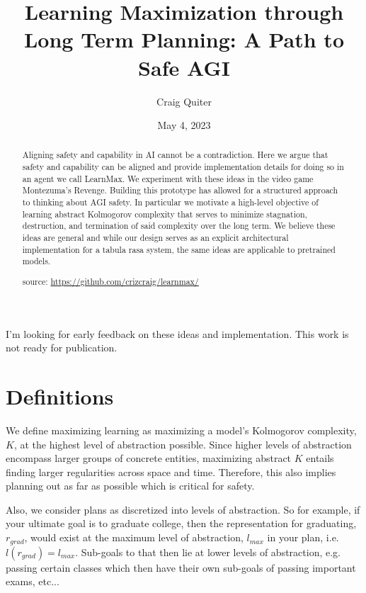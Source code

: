 \documentclass{article}
\title{Learning Maximization through Long Term Planning: A Path to Safe AGI}
\author{Craig Quiter}
\date{May 4, 2023}
\begin{document}
\maketitle

\begin{tcolorbox}
I'm looking for early feedback on these ideas and implementation. This work is not ready for publication.
\end{tcolorbox}

\begin{abstract}
Aligning safety and capability in AI cannot be a contradiction.
Here we argue that safety and capability can be aligned and provide implementation details for doing so in an agent we call LearnMax. We experiment with these ideas in the video game Montezuma's Revenge. Building this prototype has allowed for a structured approach to thinking about AGI safety. In particular we motivate a high-level objective of learning abstract Kolmogorov complexity that serves to minimize stagnation, destruction, and termination of said complexity over the long term. We believe these ideas are general and while our design serves as an explicit architectural implementation for a tabula rasa system, the same ideas are applicable to pretrained models.

source: \href{https://github.com/crizcraig/learnmax/}{https://github.com/crizcraig/learnmax/}
\end{abstract}

\setcounter{secnumdepth}{-1}

\section{Definitions}

We define maximizing learning as maximizing a model's Kolmogorov complexity, $K$,\cite{li2008introduction} at the highest level of abstraction possible. Since higher levels of abstraction encompass larger groups of concrete entities, maximizing abstract $K$ entails finding larger regularities across space and time. Therefore, this also implies planning out as far as possible which is critical for safety.

Also, we consider plans as discretized into levels of abstraction. So for example, if your ultimate goal is to graduate college, then the representation for graduating, $r_{grad}$, would exist at the maximum level of abstraction, $l_{max}$ in your plan, i.e. $l(r_{grad}) = l_{max}$. Sub-goals to that then lie at lower levels of abstraction, e.g. passing certain classes which then have their own sub-goals of passing important exams, etc...
\end{document}
